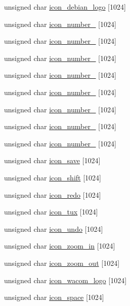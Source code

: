 \begin{DoxyCompactItemize}
unsigned char \hyperlink{icon-library_8cpp_aa45b8bca2d3b388f48fa19f11ad1bb76}{icon\_\-debian\_\-logo} \mbox{[}1024\mbox{]}
\item 
unsigned char \hyperlink{icon-library_8cpp_a01cc14f08c8a16f5dac156df3bc46f65}{icon\_\-number\_} \mbox{[}1024\mbox{]}
\item 
unsigned char \hyperlink{icon-library_8cpp_a57f44f5bc4c0084b3bc620934cdb6523}{icon\_\-number\_} \mbox{[}1024\mbox{]}
\item 
unsigned char \hyperlink{icon-library_8cpp_a12352549200a87166239e25ecf86e49c}{icon\_\-number\_} \mbox{[}1024\mbox{]}
\item 
unsigned char \hyperlink{icon-library_8cpp_ac3d10832f5f5327f04c10fb22a4b4d99}{icon\_\-number\_} \mbox{[}1024\mbox{]}
\item 
unsigned char \hyperlink{icon-library_8cpp_a261f479117fb05bbe64fba0111a30fed}{icon\_\-number\_} \mbox{[}1024\mbox{]}
\item 
unsigned char \hyperlink{icon-library_8cpp_a9e8fd90cd27a2ecd801d93ae56eb734c}{icon\_\-number\_} \mbox{[}1024\mbox{]}
\item 
unsigned char \hyperlink{icon-library_8cpp_a52e626c8ba6cf28abff3b5c96b14dea9}{icon\_\-number\_} \mbox{[}1024\mbox{]}
\item 
unsigned char \hyperlink{icon-library_8cpp_a03e82d828cc979e7ad4f5fdd9fadc5e4}{icon\_\-number\_} \mbox{[}1024\mbox{]}
\item 
unsigned char \hyperlink{icon-library_8cpp_a06566499a4fb44a07cc0ca346e79bdbe}{icon\_\-save} \mbox{[}1024\mbox{]}
\item 
unsigned char \hyperlink{icon-library_8cpp_a6ad47e3fa3c2e9f68b3e1de5d49b9b61}{icon\_\-shift} \mbox{[}1024\mbox{]}
\item 
unsigned char \hyperlink{icon-library_8cpp_aa3ab9b1ea31f6b609ed747e7c5aa3591}{icon\_\-redo} \mbox{[}1024\mbox{]}
\item 
unsigned char \hyperlink{icon-library_8cpp_af1dfdb4c15f06e3a04d0bbebd33003f2}{icon\_\-tux} \mbox{[}1024\mbox{]}
\item 
unsigned char \hyperlink{icon-library_8cpp_a0d47abd07a52538f30d92d7605774894}{icon\_\-undo} \mbox{[}1024\mbox{]}
\item 
unsigned char \hyperlink{icon-library_8cpp_a58218e6d1a56e2333eb100acf483c745}{icon\_\-zoom\_\-in} \mbox{[}1024\mbox{]}
\item 
unsigned char \hyperlink{icon-library_8cpp_af79cc607708d1ac758ce315d5fea778a}{icon\_\-zoom\_\-out} \mbox{[}1024\mbox{]}
\item 
unsigned char \hyperlink{icon-library_8cpp_a943110285793a4d3d423f7ec88a6e5b1}{icon\_\-wacom\_\-logo} \mbox{[}1024\mbox{]}
\item 
unsigned char \hyperlink{icon-library_8cpp_a96b0ba8ae40eabbcfab2b19f72b07042}{icon\_\-space} \mbox{[}1024\mbox{]}
\end{DoxyCompactItemize}


